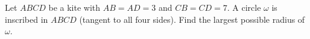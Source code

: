 Let $ABCD$ be a kite with $AB=AD=3$ and $CB=CD=7$. A circle $\omega$ is inscribed in $ABCD$ (tangent to all four sides). Find the largest possible radius of $\omega$.
